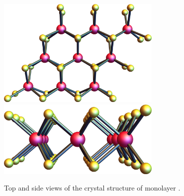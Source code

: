 \begin{figure}
  \centering
  \includegraphics[width=0.7\textwidth]{figures/tmd-crystal-top.png}
  \includegraphics[width=0.7\textwidth]{figures/tmd-crystal-side.png}
  \caption{%
    Top and side views of the crystal structure of monolayer .
  }\label{fig:tmd-crystal}
\end{figure}
